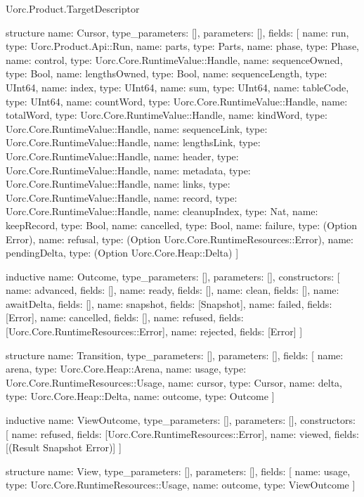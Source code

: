 \begin{lexlean}{Uorc.Product.TargetDescriptor}
\begin{semanticmodule}
structure{
  name: Cursor,
  type_parameters: [],
  parameters: [],
  fields: [
    {name: run, type: Uorc.Product.Api::Run},
    {name: parts, type: Parts},
    {name: phase, type: Phase},
    {name: control, type: Uorc.Core.RuntimeValue::Handle},
    {name: sequenceOwned, type: Bool},
    {name: lengthsOwned, type: Bool},
    {name: sequenceLength, type: UInt64},
    {name: index, type: UInt64},
    {name: sum, type: UInt64},
    {name: tableCode, type: UInt64},
    {name: countWord, type: Uorc.Core.RuntimeValue::Handle},
    {name: totalWord, type: Uorc.Core.RuntimeValue::Handle},
    {name: kindWord, type: Uorc.Core.RuntimeValue::Handle},
    {name: sequenceLink, type: Uorc.Core.RuntimeValue::Handle},
    {name: lengthsLink, type: Uorc.Core.RuntimeValue::Handle},
    {name: header, type: Uorc.Core.RuntimeValue::Handle},
    {name: metadata, type: Uorc.Core.RuntimeValue::Handle},
    {name: links, type: Uorc.Core.RuntimeValue::Handle},
    {name: record, type: Uorc.Core.RuntimeValue::Handle},
    {name: cleanupIndex, type: Nat},
    {name: keepRecord, type: Bool},
    {name: cancelled, type: Bool},
    {name: failure, type: (Option Error)},
    {name: refusal, type: (Option Uorc.Core.RuntimeResources::Error)},
    {name: pendingDelta, type: (Option Uorc.Core.Heap::Delta)}
  ]
}

inductive{
  name: Outcome,
  type_parameters: [],
  parameters: [],
  constructors: [
    {name: advanced, fields: []},
    {name: ready, fields: []},
    {name: clean, fields: []},
    {name: awaitDelta, fields: []},
    {name: snapshot, fields: [Snapshot]},
    {name: failed, fields: [Error]},
    {name: cancelled, fields: []},
    {name: refused, fields: [Uorc.Core.RuntimeResources::Error]},
    {name: rejected, fields: [Error]}
  ]
}

structure{
  name: Transition,
  type_parameters: [],
  parameters: [],
  fields: [
    {name: arena, type: Uorc.Core.Heap::Arena},
    {name: usage, type: Uorc.Core.RuntimeResources::Usage},
    {name: cursor, type: Cursor},
    {name: delta, type: Uorc.Core.Heap::Delta},
    {name: outcome, type: Outcome}
  ]
}

inductive{
  name: ViewOutcome,
  type_parameters: [],
  parameters: [],
  constructors: [
    {name: refused, fields: [Uorc.Core.RuntimeResources::Error]},
    {name: viewed, fields: [(Result Snapshot Error)]}
  ]
}

structure{
  name: View,
  type_parameters: [],
  parameters: [],
  fields: [
    {name: usage, type: Uorc.Core.RuntimeResources::Usage},
    {name: outcome, type: ViewOutcome}
  ]
}


\end{semanticmodule}
\end{lexlean}
